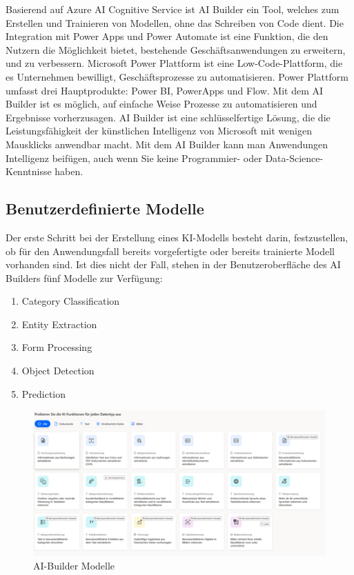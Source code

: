 



Basierend auf Azure AI Cognitive Service ist AI Builder ein Tool, welches zum Erstellen und Trainieren von Modellen, ohne das Schreiben von Code dient. Die Integration mit Power Apps und Power Automate ist eine Funktion, die den Nutzern die Möglichkeit bietet, bestehende Geschäftsanwendungen zu erweitern, und zu verbessern.
Microsoft Power Plattform ist eine Low-Code-Plattform, die es Unternehmen bewilligt, Geschäftsprozesse zu automatisieren. Power Plattform umfasst drei Hauptprodukte: Power BI, PowerApps und Flow.
Mit dem AI Builder ist es möglich, auf einfache Weise Prozesse zu automatisieren und Ergebnisse vorherzusagen. AI Builder ist eine schlüsselfertige Lösung, die die Leistungsfähigkeit der künstlichen Intelligenz von Microsoft mit wenigen Mausklicks anwendbar macht. Mit dem AI Builder kann man Anwendungen Intelligenz beifügen, auch wenn Sie keine Programmier- oder Data-Science-Kenntnisse haben.

\subsection{Benutzerdefinierte Modelle}

Der erste Schritt bei der Erstellung eines KI-Modells besteht darin, festzustellen, ob für den Anwendungsfall bereits vorgefertigte oder bereits trainierte Modell vorhanden sind. Ist dies nicht der Fall, stehen in der Benutzeroberfläche des AI Builders fünf Modelle zur Verfügung:

\begin{enumerate}
    \item Category Classification
    \item Entity Extraction
    \item Form Processing
    \item Object Detection
    \item Prediction
\end{enumerate}

\begin{figure}[h]
    \centering
    \includegraphics[scale=0.9]{sections/cloud-computing/images/ai-builder-models.png}
    \caption{AI-Builder Modelle}
    \label{fig:kimldl-comparison}
\end{figure}


